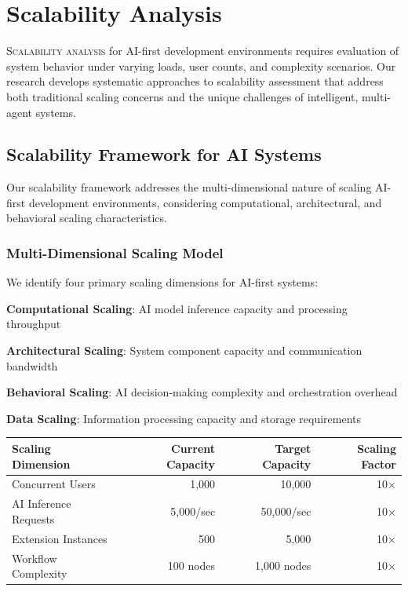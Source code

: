 
\section*{Scalability Analysis}

\lettrine{S}{calability analysis} for AI-first development environments requires evaluation of system behavior under varying loads, user counts, and complexity scenarios. Our research develops systematic approaches to scalability assessment that address both traditional scaling concerns and the unique challenges of intelligent, multi-agent systems.

\subsection*{Scalability Framework for AI Systems}

Our scalability framework addresses the multi-dimensional nature of scaling AI-first development environments, considering computational, architectural, and behavioral scaling characteristics.

\subsubsection*{Multi-Dimensional Scaling Model}

We identify four primary scaling dimensions for AI-first systems:

\begin{expandedlist}
    \item \textbf{Computational Scaling}: AI model inference capacity and processing throughput
    \item \textbf{Architectural Scaling}: System component capacity and communication bandwidth
    \item \textbf{Behavioral Scaling}: AI decision-making complexity and orchestration overhead
    \item \textbf{Data Scaling}: Information processing capacity and storage requirements
\end{expandedlist}

\begin{center}
\begin{tabular}{@{}lrrr@{}}
\toprule
\textbf{Scaling Dimension} & \textbf{Current Capacity} & \textbf{Target Capacity} & \textbf{Scaling Factor} \\
\midrule
Concurrent Users & 1,000 & 10,000 & 10× \\
AI Inference Requests & 5,000/sec & 50,000/sec & 10× \\
Extension Instances & 500 & 5,000 & 10× \\
Workflow Complexity & 100 nodes & 1,000 nodes & 10× \\
\bottomrule
\end{tabular}
\end{center}

